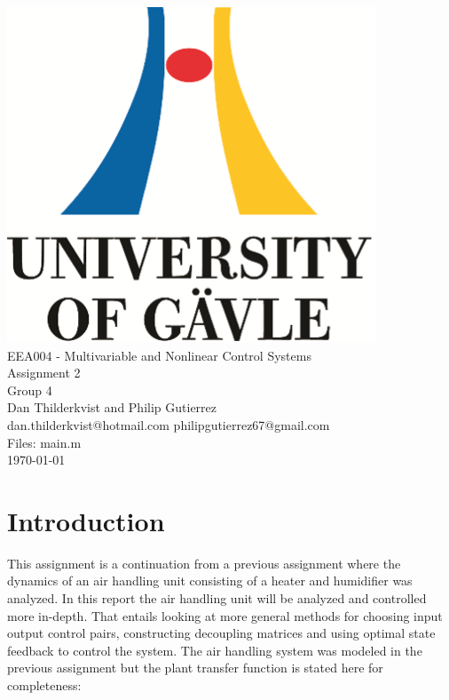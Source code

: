 \documentclass[a4paper, titlepage]{article}
\begin{document}
\begin{titlepage}
  \begin{center}
    \vspace*{1cm}
    \includegraphics[scale=1.0]{../figures/hig_logo_eng.png}\\
    \vspace{1.5cm}
    \large EEA004 - Multivariable and Nonlinear Control Systems\\
    \large Assignment 2\\
    \vspace{1.5cm}
    Group 4\\
    Dan Thilderkvist and Philip Gutierrez\\
    dan.thilderkvist@hotmail.com philipgutierrez67@gmail.com\\
    Files: main.m\\
    
    \vspace{1cm}
    \today
  \end{center}
\end{titlepage}


\section{Introduction}
This assignment is a continuation from a previous assignment where the dynamics of an air handling unit consisting of a heater and humidifier was analyzed.
In this report the air handling unit will be analyzed and controlled more in-depth.
That entails looking at more general methods for choosing input output control pairs, constructing decoupling matrices and using optimal state feedback to control the system.
The air handling system was modeled in the previous assignment but the plant transfer function is stated here for completeness:
\end{document}
